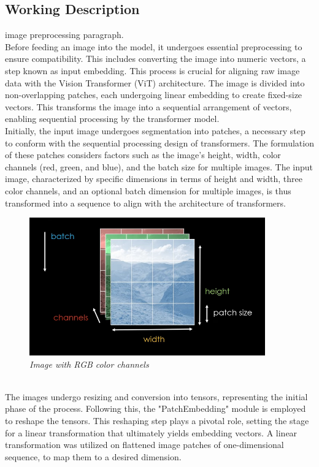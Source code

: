 \subsection{Working Description}

 image preprocessing paragraph.\\

Before feeding an image into the model, it undergoes essential preprocessing to ensure compatibility. This includes converting the image into numeric vectors, a step known as input embedding. This process is crucial for aligning raw image data with the Vision Transformer (ViT) architecture. The image is divided into non-overlapping patches, each undergoing linear embedding to create fixed-size vectors. This transforms the image into a sequential arrangement of vectors, enabling sequential processing by the transformer model.\\

Initially, the input image undergoes segmentation into patches, a necessary step to conform with the sequential processing design of transformers. The formulation of these patches considers factors such as the image's height, width, color channels (red, green, and blue), and the batch size for multiple images. The input image, characterized by specific dimensions in terms of height and width, three color channels, and an optional batch dimension for multiple images, is thus transformed into a sequence to align with the architecture of transformers.\\
\begin{figure}[htbp]
    \centering
    \includegraphics[width=4in]{img/colorbatch.png}
    \caption{\textit{Image with RGB color channels}}
\end{figure}\\
The images undergo resizing and conversion into tensors, representing the initial phase of the process. Following this, the "PatchEmbedding" module is employed to reshape the tensors. This reshaping step plays a pivotal role, setting the stage for a linear transformation that ultimately yields embedding vectors. A linear transformation was utilized on flattened image patches of one-dimensional sequence, to map them to a desired dimension.\\

